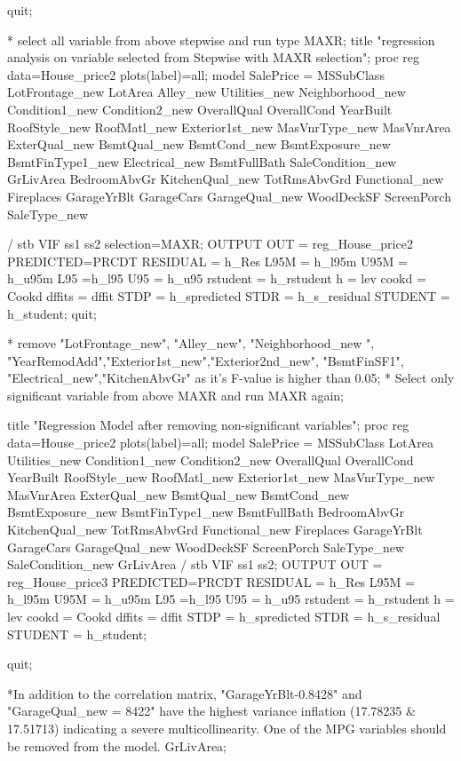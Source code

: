 quit;

* select all variable from above stepwise and run type MAXR;
title "regression analysis on variable selected from Stepwise with MAXR selection";
proc reg data=House_price2
plots(label)=all;
	model 	SalePrice =		
			MSSubClass		LotFrontage_new	LotArea				Alley_new
			Utilities_new	Neighborhood_new Condition1_new	Condition2_new		OverallQual		
			OverallCond		YearBuilt		RoofStyle_new	RoofMatl_new	Exterior1st_new			MasVnrType_new	
			MasVnrArea		ExterQual_new	BsmtQual_new	BsmtCond_new	BsmtExposure_new 
			BsmtFinType1_new Electrical_new	BsmtFullBath	SaleCondition_new	GrLivArea
			BedroomAbvGr	KitchenQual_new	TotRmsAbvGrd	Functional_new	Fireplaces			
			GarageYrBlt		GarageCars		GarageQual_new	WoodDeckSF			ScreenPorch		
			SaleType_new	
			
	/   stb     VIF ss1 ss2 selection=MAXR;
	OUTPUT OUT = reg_House_price2 PREDICTED=PRCDT RESIDUAL = h_Res
	L95M = h_l95m U95M  = h_u95m L95 =h_l95 U95 = h_u95 
	rstudent = h_rstudent h = lev cookd = Cookd dffits = dffit 
	STDP = h_spredicted STDR = h_s_residual STUDENT = h_student;
quit;

* remove "LotFrontage_new", "Alley_new", "Neighborhood_new ", "YearRemodAdd","Exterior1st_new","Exterior2nd_new",
"BsmtFinSF1", "Electrical_new","KitchenAbvGr" as it's F-value is higher than 0.05;
* Select only significant variable from above MAXR and run MAXR again;

title "Regression Model after removing non-significant variables";
proc reg data=House_price2
plots(label)=all;
	model 	SalePrice =		
			MSSubClass		LotArea		Utilities_new	 Condition1_new	Condition2_new		
			OverallQual		OverallCond		YearBuilt	RoofStyle_new	RoofMatl_new	Exterior1st_new								
			MasVnrType_new	MasVnrArea		ExterQual_new	BsmtQual_new
			BsmtCond_new	BsmtExposure_new BsmtFinType1_new 		BsmtFullBath
			BedroomAbvGr	KitchenQual_new	TotRmsAbvGrd	Functional_new	Fireplaces			
			GarageYrBlt		GarageCars		GarageQual_new	WoodDeckSF			
			ScreenPorch		SaleType_new	SaleCondition_new	GrLivArea
	/   stb     VIF ss1 ss2;
	OUTPUT OUT = reg_House_price3 PREDICTED=PRCDT RESIDUAL = h_Res
	L95M = h_l95m U95M  = h_u95m L95 =h_l95 U95 = h_u95 
	rstudent = h_rstudent h = lev cookd = Cookd dffits = dffit 
	STDP = h_spredicted STDR = h_s_residual STUDENT = h_student;
      
quit;

*In addition to the correlation matrix,  "GarageYrBlt-0.8428" and "GarageQual_new = 8422" have the highest variance inflation (17.78235 & 17.51713) indicating a severe multicollinearity. 
One of the MPG variables should be removed from the model. GrLivArea;

